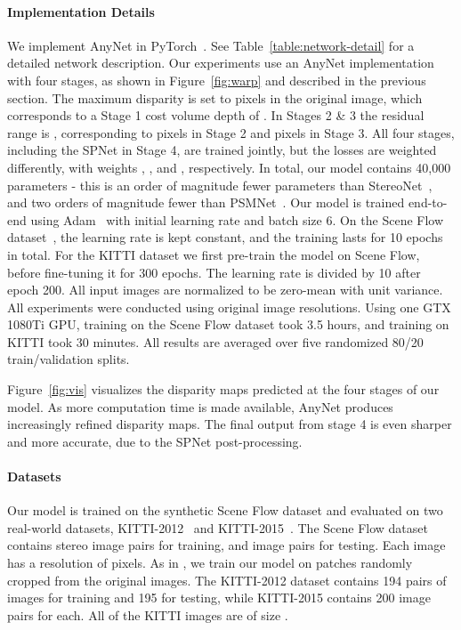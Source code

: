 \documentclass[letterpaper, 10 pt, conference]{ieeeconf}
\newcommand{\nameshort}[1]{AnyNet}
\newcommand{\spnshort}[1]{SPNet}
\begin{document}
 \paragraph{\textbf{Implementation Details}}
We implement \nameshort{} in PyTorch~\cite{paszke2017automatic}. See Table~\ref{table:network-detail} for a detailed network description.
Our experiments use an \nameshort{} implementation with four stages, as shown in Figure~\ref{fig:warp} and described in the previous section. The maximum disparity is set to  pixels in the original image, which corresponds to a Stage 1 cost volume depth of . In Stages 2 \& 3 the residual range is , corresponding to  pixels in Stage 2 and  pixels in Stage 3.
All four stages, including the \spnshort{} in Stage 4, are trained jointly, but the losses are weighted differently, with weights , ,  and , respectively.  In total, our model contains 40,000 parameters - this is an order of magnitude fewer parameters than StereoNet~\cite{khamis2018stereonet}, and two orders of magnitude fewer than PSMNet~\cite{zhao2017pyramid}. Our model is trained end-to-end using Adam~\cite{kingma2014adam} with initial learning rate  and batch size 6. On the Scene Flow dataset~\cite{mayer2016large}, the learning rate is kept constant, and the training lasts for 10 epochs in total. For the KITTI dataset we first pre-train the model on Scene Flow, before fine-tuning it for 300 epochs.
The learning rate is divided by 10 after epoch 200. All input images are normalized to be zero-mean with unit variance. All experiments were conducted using original image resolutions. Using one GTX 1080Ti GPU, training on the Scene Flow dataset took 3.5 hours, and training on KITTI took 30 minutes. All results are averaged over five randomized 80/20 train/validation splits. 

 Figure~\ref{fig:vis} visualizes the disparity maps predicted at the four stages of our model. As more computation time is made available, \nameshort{} produces increasingly refined disparity maps. The final output from stage 4 is even sharper and more accurate, due to the SPNet post-processing.

\paragraph{\textbf{Datasets}} Our model is trained on the synthetic Scene Flow \cite{mayer2016large} dataset and evaluated on two real-world datasets, KITTI-2012~\cite{Geiger2012CVPR} and KITTI-2015~\cite{Menze2015CVPR}. The Scene Flow dataset contains  stereo image pairs for training, and  image pairs for testing. Each image has a resolution of  pixels. As in \cite{kendall2017end}, we train our model on  patches randomly cropped from the original images. The KITTI-2012 dataset contains 194 pairs of images for training and 195 for testing, while KITTI-2015 contains 200 image pairs for each. All of the KITTI images are of size .
\end{document}
